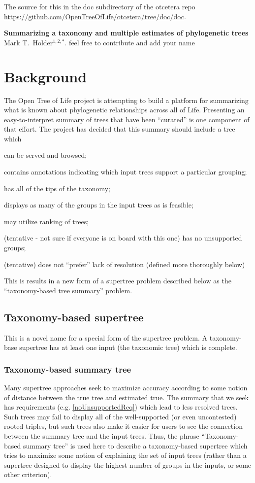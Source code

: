 \documentclass[11pt]{article}
\newcommand{\otol}{Open Tree of Life\xspace}
\begin{document}
The source for this in the doc subdirectory of the otcetera
    repo \url{https://github.com/OpenTreeOfLife/otcetera/tree/doc/doc}.
\begin{center}
    {\bf Summarizing a taxonomy and multiple estimates of phylogenetic trees} \\
{Mark T.~Holder$^{1,2,\ast}$. feel free to contribute and add your name}
\end{center}
\tableofcontents
\section{Background}
The \otol project is attempting to build a platform for summarizing what is known
    about phylogenetic relationships across all of Life.
Presenting an easy-to-interpret summary of trees that have been ``curated''
    is one component of that effort.
The project has decided that this summary should include a tree which
\begin{compactenum}
    \item can be served and browsed;
    \item contains annotations indicating which input trees support a particular grouping;
    \item has all of the tips of the taxonomy;
    \item displays as many of the groups in the input trees as is feasible;
    \item may utilize ranking of trees;
    \item (tentative - not sure if everyone is on board with this one) has no unsupported groups;\label{noUnsupportedReq}
    \item (tentative) does not ``prefer'' lack of resolution (defined more thoroughly below)
\end{compactenum}
This is results in a new form of a supertree problem described below as the ``taxonomy-based tree summary'' problem.
\subsection{Taxonomy-based supertree}
This is a novel name for a special form of the supertree problem.
A taxonomy-base supertree has at least one input (the taxonomic tree) which is complete.
\subsubsection{Taxonomy-based summary tree}
Many supertree approaches seek to maximize accuracy according to some notion
    of distance between the true tree and estimated true.
The summary that we seek has requirements (e.g. \ref{noUnsupportedReq})
    which lead to less resolved trees.
Such trees may fail to display all of the well-supported (or even uncontested)
    rooted triples, but such trees also make it easier for users to see the
    connection between the summary tree and the input trees.
Thus, the phrase ``Taxonomy-based summary tree'' is used here to describe a
    taxonomy-based supertree which tries to maximize some notion of
    explaining the set of input trees (rather than a supertree designed to
    display the highest number of groups in the inputs, or some other criterion).
\end{document}
